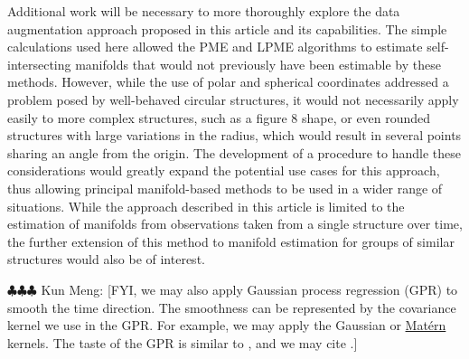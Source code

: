 \documentclass[11pt,reqno]{article}
\newcommand{\meng}[1]{{\color{purple} \sf $\clubsuit\clubsuit\clubsuit$ Kun Meng: [#1]}}
\theoremstyle{definition}
\begin{document}
Additional work will be necessary to more thoroughly explore the data augmentation approach proposed in this article and its capabilities. The simple calculations used here allowed the PME and LPME algorithms to estimate self-intersecting manifolds that would not previously have been estimable by these methods. However, while the use of polar and spherical coordinates addressed a problem posed by well-behaved circular structures, it would not necessarily apply easily to more complex structures, such as a figure 8 shape, or even rounded structures with large variations in the radius, which would result in several points sharing an angle from the origin. The development of a procedure to handle these considerations would greatly expand the potential use cases for this approach, thus allowing principal manifold-based methods to be used in a wider range of situations. While the approach described in this article is limited to the estimation of manifolds from observations taken from a single structure over time, the further extension of this method to manifold estimation for groups of similar structures would also be of interest.


\meng{FYI, we may also apply Gaussian process regression (GPR) to smooth the time direction. The smoothness can be represented by the covariance kernel we use in the GPR. For example, we may apply the Gaussian or \href{https://en.wikipedia.org/wiki/Matern_covariance_function}{Matérn} kernels. The taste of the GPR is similar to \cite{dunsonInferringManifoldsNoisy2022}, and we may cite \cite{dunsonInferringManifoldsNoisy2022}.}
\newpage

\nocite{*}
%
%
\printbibliography
\end{document}
